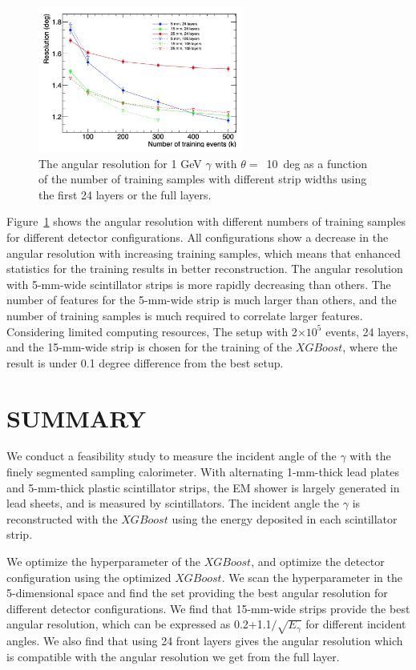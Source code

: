 \documentclass[jkps,preprint,fleqn,showpacs,showkeys]{revtex4}
\newcommand{\XGB}{XGBoost}
\begin{document}
\begin{figure}[!hbt]
\includegraphics[width=0.6\textwidth]{figures/layer-event.jpg}
\caption{ The angular resolution for 1 GeV $\gamma$ with $\theta=$~10~deg as a function of the number of training samples with different strip widths using the first 24 layers or the full layers. }
\label{fig:multi-parameter}
\end{figure}

Figure~\ref{fig:multi-parameter} shows the angular resolution with different numbers of training samples for different detector configurations. All configurations show a decrease in the angular resolution with increasing training samples, which means that enhanced statistics for the training results in better reconstruction. The angular resolution with 5-mm-wide scintillator strips is more rapidly decreasing than others. The number of features for the 5-mm-wide strip is much larger than others, and the number of training samples is much required to correlate larger features. Considering limited computing resources, The setup with 2$\times10^{5}$ events, 24 layers, and the 15-mm-wide strip is chosen for the training of the $\XGB$, where the result is under 0.1 degree difference from the best setup.
 
\section{SUMMARY}
\label{sec:sum}

We conduct a feasibility study to measure the incident angle of the $\gamma$ with the finely segmented sampling calorimeter. With alternating 1-mm-thick lead plates and 5-mm-thick plastic scintillator strips, the EM shower is largely generated in lead sheets, and is measured by scintillators. The incident angle the $\gamma$ is reconstructed with the $\XGB$ using the energy deposited in each scintillator strip.

We optimize the hyperparameter of the $\XGB$, and optimize the detector configuration using the optimized $\XGB$. We scan the hyperparameter in the 5-dimensional space and find the set providing the best angular resolution for different detector configurations. We find that 15-mm-wide strips provide the best angular resolution, which can be expressed as 0.2+1.1$/ \sqrt{E_\gamma}$ for different incident angles. We also find that using 24 front layers gives the angular resolution which is compatible with the angular resolution we get from the full layer.
\end{document}
